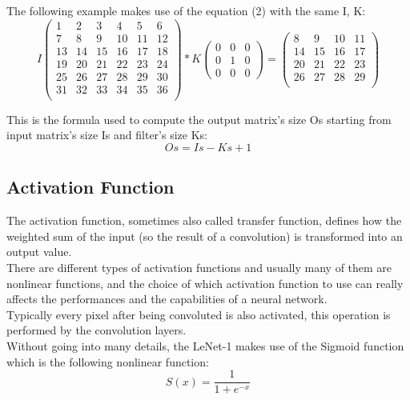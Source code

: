 \documentclass[a4paper]{report}
\begin{document}
The following example makes use of the equation (2) with the same I, K:
\[
I
\left(
\begin{array}{ccccccc}
  1&   2&  3&   4&   5&   6  \\
  7&   8&  9&  10&  11& 12         \\
  13&   14& 15& 16& 17& 18  \\
  19&   20& 21& 22& 23& 24 \\
  25&   26& 27& 28& 29& 30  \\
  31&   32& 33& 34& 35& 36 \\
\end{array}
\right)
*
K
\left(
\begin{array}{ccc}
  0&   0&  0 \\
  0&   1&  0 \\
  0&   0& 0 
\end{array}
\right)
=
\left(
\begin{array}{ccccc}
  8&  9&  10&  11 \\
  14& 15& 16& 17  \\
  20& 21& 22& 23 \\
  26& 27& 28& 29 \\
\end{array}
\right)
\]

This is the formula used to compute the output matrix's size Os starting from input matrix's size Is and filter's size Ks:
\begin{equation} 
\label{outsize}
Os = Is - Ks +1
 \end{equation}

\subsection{Activation Function}
The activation function, sometimes also called transfer function, defines how the weighted sum of the input (so the result of a convolution) is transformed into an output value.\\
There are different types of activation functions and usually many of them are nonlinear functions,  and the choice of which activation function to use can really affects the performances and the capabilities of a neural network.\\
Typically every pixel after being convoluted is also activated, this operation is performed by the convolution layers.\\
Without going into many details, the LeNet-1 makes use of the Sigmoid function which is the following nonlinear function:
\begin{equation} 
\label{outsize}
S(x) = \frac{1}{1+e^{-x}}
 \end{equation}
 
\end{document}
